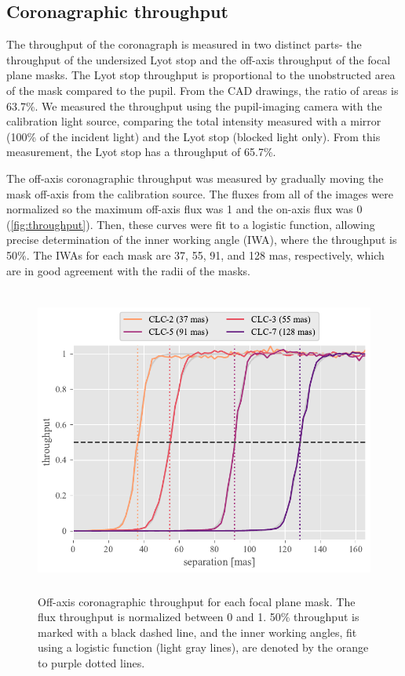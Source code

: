 \documentclass[]{spie}  %
\begin{document}
\subsection{Coronagraphic throughput}

The throughput of the coronagraph is measured in two distinct parts- the throughput of the undersized Lyot stop and the off-axis throughput of the focal plane masks. The Lyot stop throughput is proportional to the unobstructed area of the mask compared to the pupil. From the CAD drawings, the ratio of areas is 63.7\%. We measured the throughput using the pupil-imaging camera with the calibration light source, comparing the total intensity measured with a mirror (100\% of the incident light) and the Lyot stop (blocked light only). From this measurement, the Lyot stop has a throughput of 65.7\%.

The off-axis coronagraphic throughput was measured by gradually moving the mask off-axis from the calibration source. The fluxes from all of the images were normalized so the maximum off-axis flux was 1 and the on-axis flux was 0 (\autoref{fig:throughput}). Then, these curves were fit to a logistic function, allowing precise determination of the inner working angle (IWA), where the throughput is 50\%. The IWAs for each mask are 37, 55, 91, and 128 mas, respectively, which are in good agreement with the radii of the masks.


\begin{figure}
   \centering
   \includegraphics[height=4in]{figures/throughput_curves}
   \caption{Off-axis coronagraphic throughput for each focal plane mask. The flux throughput is normalized between 0 and 1. 50\% throughput is marked with a black dashed line, and the inner working angles, fit using a logistic function (light gray lines), are denoted by the orange to purple dotted lines.}\label{fig:throughput}
\end{figure}
\end{document}

